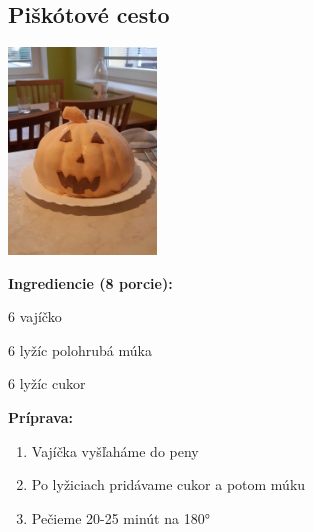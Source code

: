 \setcounter{step}{0}

\subsection{ Piškótové cesto }

\begin{ingredient}
  
      \includegraphics[height=5.5cm]{images/pistkot_krem_salko}
  
  \def\portions{  }
  \textbf{ {\normalsize Ingrediencie (8 porcie):} }

  \begin{main}
      \item 6 vajíčko
      \item 6 lyžíc polohrubá múka
      \item 6 lyžíc cukor
  \end{main}
  
\end{ingredient}
\begin{recipe}
\textbf{ {\normalsize Príprava:} }
\begin{enumerate}

  \item{Vajíčka vyšľaháme do peny}
  \item{Po lyžiciach pridávame cukor a potom múku}
  \item{Pečieme 20-25 minút na 180°}

\end{enumerate}
\end{recipe}

\begin{notes}
  
\end{notes}	
\clearpage
